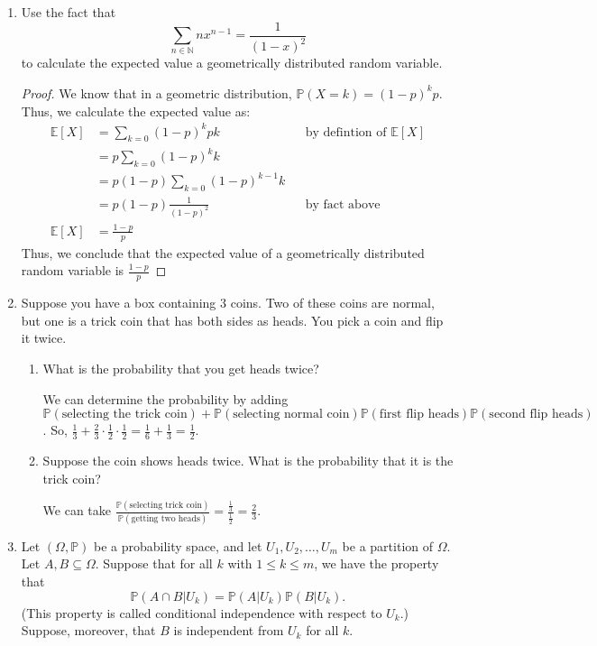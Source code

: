 \documentclass[12pt]{article}
\newcommand{\N}{\mathbb{N}}
\renewcommand{\P}{\mathbb{P}}
\newcommand{\p}[1]{\P\left(#1\right)}
\begin{document}
\begin{enumerate}
\item Use the fact that 
\[\sum_{n\in\N} nx^{n-1} = \frac{1}{(1-x)^2}\]
to calculate the expected value a geometrically distributed random variable.

\begin{proof}
We know that in a geometric distribution, $\p{X = k} = (1-p)^kp$. Thus, we calculate the expected value as:
\begin{align*}
\mathbb{E}[X] &= \sum_{k=0} (1-p)^kp k && \text{by defintion of $\mathbb{E}[X]$}\\
&= p\sum_{k=0} (1-p)^kk \\
&= p(1-p)\sum_{k=0} (1-p)^{k-1}k \\
&= p(1-p) \frac{1}{(1-p)^2} && \text{by fact above}\\
\mathbb{E}[X] &= \frac{1 - p}{p} 
\end{align*}
Thus, we conclude that the expected value of a geometrically distributed random variable is $\frac{1-p}{p}$
\end{proof}

\item Suppose you have a box containing 3 coins. Two of these coins are normal, but one is a trick coin that has both sides as heads. You pick a coin and flip it twice.
\begin{enumerate}
\item What is the probability that you get heads twice?

We can determine the probability by adding $\p{\text{selecting the trick coin}} + \p{\text{selecting normal coin}}\p{\text{first flip heads}}\p{\text{second flip heads}}$. So, $\frac{1}{3} + \frac{2}{3}\cdot \frac{1}{2}\cdot \frac{1}{2} = \frac{1}{6} + \frac{1}{3}= \frac{1}{2}$.

\item Suppose the coin shows heads twice. What is the probability that it is the trick coin?

We can take $\frac{\p{\text{selecting trick coin}}}{\p{\text{getting two heads}}} = \frac{\frac{1}{3}}{\frac{1}{2}} = \frac{2}{3}$. 
\end{enumerate}

\item Let $(\Omega, \P)$ be a probability space, and let $U_1, U_2, \dots, U_m$ be a partition of $\Omega$. Let $A, B\subseteq \Omega$. Suppose that for all $k$ with $1\leq k\leq m$, we have the property that
\[\p{A\cap B\vert U_k} = \p{A\vert U_k}\p{B\vert U_k}.\]
(This property is called conditional independence with respect to $U_k$.) Suppose, moreover, that $B$ is independent from $U_k$ for all $k$.


\end{enumerate}
\end{document}
